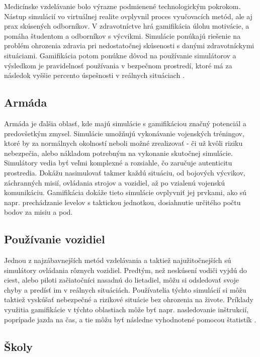 \documentclass[10pt,slovak,a4paper]{article}
\begin{document}
Medicínske vzdelávanie bolo výrazne podmienené technologickým pokrokom. Nástup simulácií vo virtuálnej realite ovplyvnil proces vyučovacích metód, ale aj prax skúsených odborníkov. V zdravotníctve hrá gamifikácia úlohu motivácie, a pomáha študentom a odborníkov s výcvikmi. Simulácie ponúkajú riešenie na problém ohrozenia zdravia pri nedostatočnej skúsenosti s danými zdravotníckymi situáciami. Gamifikácia potom ponúkne dôvod na používanie simulátorov a výsledkom je pravidelnosť používania v bezpečnom prostredí, ktoré má za následok vyššie percento úspešnosti v reálnych situáciach \cite{Baily}.

\subsection{Armáda} \label{Armada}

Armáda je ďalšia oblasť, kde majú simulácie s gamifikáciou značný potenciál a predovšetkým zmysel. Simulácie umožňujú vykonávanie vojenských tréningov, ktoré by za normálnych okolností neboli možné zrealizovať - či už kvôli riziku nebezpečia, alebo nákladom potrebným na vykonanie skutočnej simulácie. Simulátory vedia byť veľmi komplexné a rozsiahle, čo zaručuje autenticitu prostredia. Dokážu nasimulovať takmer každú situáciu, od bojových výcvikov, záchranných misií, ovládania strojov a vozidiel, až po vzialenú vojenskú komunikáciu. Gamifikácia dokáže tieto simulácie ovplyvniť jej prvkami, ako sú napr. prechádzanie levelov s taktickou jednotkou, dosiahnutie určitého počtu bodov za misiu a pod.

\subsection{Používanie vozidiel} \label{Vozidla}

Jednou z najzábavnejších metód vzdelávania a taktiež najužitočnejších sú simulátory ovládania rôznych vozidiel. Predtým, než neskúsení vodiči vyjdú do ciest, alebo piloti začiatočníci nasadnú do lietadiel, môžu si odsledovať svoje chyby a predísť im v reálnych situáciách. Používatelia týchto simulácií si môžu  taktiež vyskúšať nebezpečné a rizikové situácie bez ohrozenia na živote. Príklady využitia gamifikácie v týchto oblastiach môže byť napr. nasledovanie inštrukcií, poprípade jazda na čas, a tie môžu byť následne vyhodnotené pomocou štatistík \cite{8052668}. 

\subsection{Školy} \label{Skola}
\end{document}
